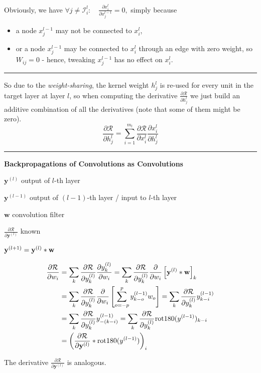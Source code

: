 \documentclass[a2paper,8pt]{extarticle}
\newcommand{\cI}{\mathcal{I}}
\newcommand{\cR}{\mathcal{R}}
\newcommand{\conv}{\ensuremath *}
\renewcommand{\vec}[1]{\mathbf{#1}}
\newcommand{\vw}{\vec{w}}
\newcommand{\vy}{\vec{y}}
\newcommand{\sep}{\vspace{0pt}\noindent\hrule\vspace{0pt}}
\newcommand{\sep}{\vspace{5pt}\noindent\hrule\vspace{5pt}}
\begin{document}
\begin{landscape}
\begin{multicols*}{7}
Obviously, we have $
\forall j\neq \cI_i^l
\colon
\quad
\frac{\partial x_i^l}{\partial x_j^{l-1}}=0,
$ simply because
\begin{itemize}
  \item a node $x_j^{l-1}$ may not be connected to $x_i^l$,
  \item or a node $x_j^{l-1}$ may be connected to $x_i^l$ through an edge with zero
  weight, so $W_{ij}=0$ - hence, tweaking $x_j^{l-1}$ has no effect on
  $x_i^{l}$.
\end{itemize}

\sep

So due to the \emph{weight-sharing}, the kernel weight $h_j^l$ is re-used for
every unit in the target layer at layer $l$, so when computing the derivative
$\frac{\partial\cR}{\partial h_j^l}$ we just build an additive combination of
all the derivatives (note that some of them might be zero).
\[
\frac{\partial \cR}{\partial h_j^l}
=
\sum_{i=1}^{m_l}
\frac{\partial \cR}{\partial x_i^l}
\frac{\partial x_i^l}{\partial h_j^l}
\]

\sep

\textbf{Backpropagations of Convolutions as Convolutions}

$\vy^{(l)}$ output of $l$-th layer

$\vy^{(l-1)}$ output of $(l-1)$-th layer / input to $l$-th layer

$\vw$ convolution filter

$\frac{\partial\cR}{\partial \vy^{(l)}}$ known

$\vy^{(l+1)}=\vy^{(l)}\conv \vw$

\begin{align*}
\frac{\partial\cR}{\partial w_i}
&=\sum_{k}\frac{\partial\cR}{\partial y^{(l)}_k}\frac{\partial
y^{(l)}_k}{\partial w_i}
=\sum_{k}\frac{\partial\cR}{\partial y^{(l)}_k}\frac{\partial}{\partial w_i}
\left[\vy^{(l)}\conv\vw\right]_k
\\
&=\sum_{k}\frac{\partial\cR}{\partial y^{(l)}_k}\frac{\partial}{\partial w_i}
\left[\sum_{o=-p}^{p} y^{(l-1)}_{k-o}w_o\right]
=\sum_{k}\frac{\partial\cR}{\partial y^{(l)}_k}
y^{(l-1)}_{k-i}
\\
&=\sum_{k}\frac{\partial\cR}{\partial y^{(l)}_k}
y^{(l-1)}_{-(k-i)}
=\sum_{k}\frac{\partial\cR}{\partial y^{(l)}_k}
\text{rot180}(y^{(l-1)})_{k-i}
\\
&=\left(\frac{\partial\cR}{\partial \vy^{(l)}}
\conv\text{rot180}(y^{(l-1)})\right)_i
\end{align*}

The derivative $\frac{\partial\cR}{\partial\vy^{(l)}}$ is analogous.


\end{multicols*}
\end{landscape}
\end{document}

